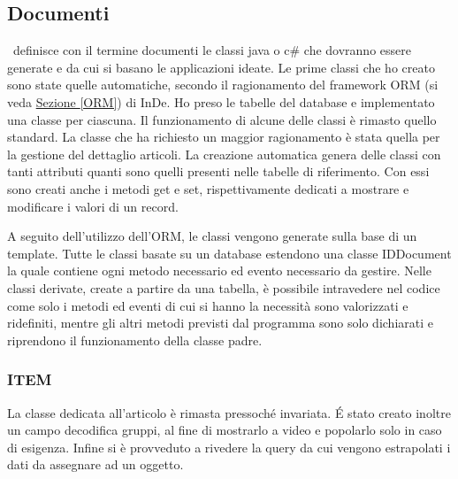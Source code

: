\subsection{Documenti}
\inde\ definisce con il termine documenti le classi java o c\# che dovranno essere generate e da cui si basano le applicazioni ideate.
Le prime classi che ho creato sono state quelle automatiche, secondo il ragionamento del framework ORM (si veda \hyperref[ORM]{Sezione \ref{ORM}}) di InDe. Ho preso le tabelle del database e implementato una classe per ciascuna. Il funzionamento di alcune delle classi è rimasto quello standard. La classe che ha richiesto un maggior ragionamento è stata quella per la gestione del dettaglio articoli.
La creazione automatica genera delle classi con tanti attributi quanti sono quelli presenti nelle tabelle di riferimento. Con essi sono creati anche i metodi get e set, rispettivamente dedicati a mostrare e modificare i valori di un record.

A seguito dell'utilizzo dell'ORM, le classi vengono generate sulla base di un template. Tutte le classi basate su un database estendono una classe IDDocument la quale contiene ogni metodo necessario ed evento necessario da gestire. Nelle classi derivate, create a partire da una tabella, è possibile intravedere nel codice come solo i metodi ed eventi di cui si hanno la necessità sono valorizzati e ridefiniti, mentre gli altri metodi previsti dal programma sono solo dichiarati e riprendono il funzionamento della classe padre.


\subsubsection{ITEM}
La classe dedicata all'articolo è rimasta pressoché invariata. \'E stato creato inoltre un campo decodifica gruppi, al fine di mostrarlo a video e popolarlo solo in caso di esigenza. Infine si è provveduto a rivedere la query da cui vengono estrapolati i dati da assegnare ad un oggetto.

